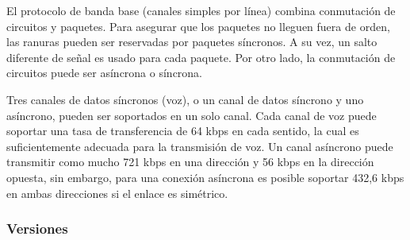El protocolo de banda base (canales simples por línea) combina conmutación de circuitos y paquetes. Para asegurar que los paquetes no lleguen fuera de orden, las ranuras pueden ser reservadas por paquetes síncronos. A su vez, un salto diferente de señal es usado para cada paquete. Por otro lado, la conmutación de circuitos puede ser asíncrona o síncrona.

Tres canales de datos síncronos (voz), o un canal de datos síncrono y uno asíncrono, pueden ser soportados en un solo canal. Cada canal de voz puede soportar una tasa de transferencia de 64 kbps en cada sentido, la cual es suficientemente adecuada para la transmisión de voz. Un canal asíncrono puede transmitir como mucho 721 kbps en una dirección y 56 kbps en la dirección opuesta, sin embargo, para una conexión asíncrona es posible soportar 432,6 kbps en ambas direcciones si el enlace es simétrico.

\subsubsection{Versiones}

